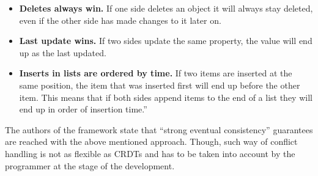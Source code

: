     \begin{itemize}
        \item {\textbf{Deletes always win.} If one side deletes an object it will always stay deleted, even if the other side has made changes to it later on.}
        \item {\textbf{Last update wins.} If two sides update the same property, the value will end up as the last updated.}
        \item {\textbf{Inserts in lists are ordered by time.} If two items are inserted at the same position, the item that was inserted first will end up before the other item. This means that if both sides append items to the end of a list they will end up in order of insertion time.}''\cite{22}
    \end{itemize}

The authors of the framework state that ``strong eventual consistency'' guarantees are reached\cite{22} with the above mentioned approach. Though, such way of conflict handling is not as flexible as CRDTs and has to be taken into account by the programmer at the stage of the development.